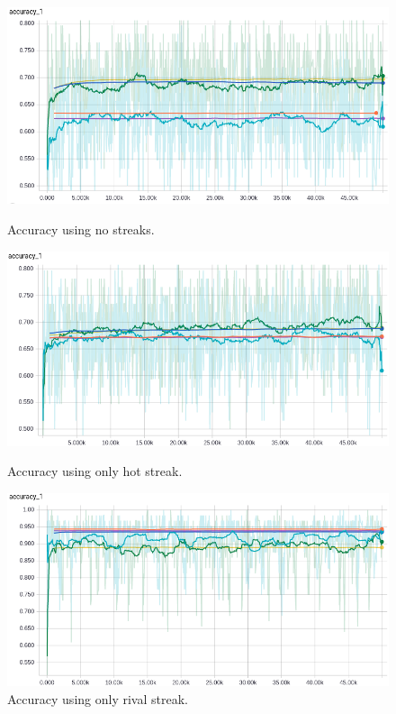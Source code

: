 \documentclass{article} %
\begin{document}
\begin{figure}[!htb]
  \includegraphics[width=\linewidth]{plots/model1/symmetrical/streak-/accuracy.png}
  \caption{Accuracy using no streaks.}\label{fig:symmetrical--accuracy}
\endminipage\hfill
{}
  \includegraphics[width=\linewidth]{plots/model1/symmetrical/streak-h/accuracy.png}
  \caption{Accuracy using only hot streak.}\label{fig:symmetrical-h-accuracy}
\endminipage\hfill
{}%
  \includegraphics[width=\linewidth]{plots/model1/symmetrical/streak-r/accuracy.png}
  \caption{Accuracy using only rival streak.}\label{fig:symmetrical-r-accuracy}

\end{figure}
\end{document}
